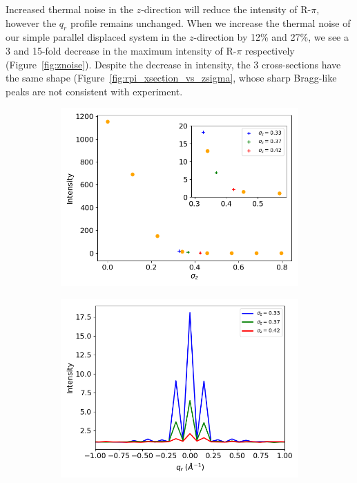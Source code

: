 \documentclass[journal=jpcbfk,manuscript=article]{achemso}
\begin{document}
  Increased thermal noise in the $z$-direction will reduce the intensity
  of R-$\pi$, however the $q_r$ profile remains unchanged. When we increase the
  thermal noise of our simple parallel displaced system in the $z$-direction by
  12\% and 27\%, we see a 3 and 15-fold decrease in the maximum intensity of 
  R-$\pi$ respectively (Figure~\ref{fig:znoise}). Despite the decrease in 
  intensity, the 3 cross-sections have the same shape 
  (Figure~\ref{fig:rpi_xsection_vs_zsigma}, whose sharp Bragg-like peaks are
  not consistent with experiment. 
  
  \begin{figure}[!htb]
  \centering
  \begin{subfigure}{0.45\textwidth}
  \includegraphics[width=\textwidth]{intensity_vs_zsigma.png}
  \caption{}\label{fig:intensity_vs_zsigma}
  \end{subfigure}
  \begin{subfigure}{0.45\textwidth}
  \includegraphics[width=\textwidth]{rpi_xsection_vs_zsigma.png}

\end{subfigure}
\end{figure}
\end{document}
